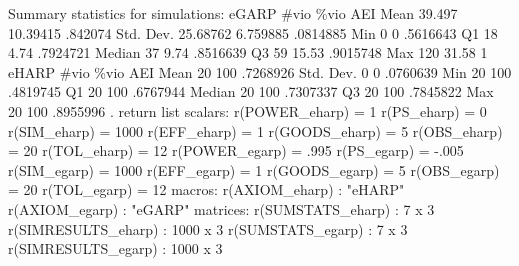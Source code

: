 Summary statistics for simulations:
{\smallskip}
       eGARP {\VBAR}      \#vio       \%vio        AEI 
        Mean {\VBAR}    39.497   10.39415    .842074 
   Std. Dev. {\VBAR}  25.68762   6.759885   .0814885 
         Min {\VBAR}         0          0   .5616643 
          Q1 {\VBAR}        18       4.74   .7924721 
      Median {\VBAR}        37       9.74   .8516639 
          Q3 {\VBAR}        59      15.53   .9015748 
         Max {\VBAR}       120      31.58          1 
{\smallskip}
{\smallskip}
       eHARP {\VBAR}      \#vio       \%vio        AEI 
        Mean {\VBAR}        20        100   .7268926 
   Std. Dev. {\VBAR}         0          0   .0760639 
         Min {\VBAR}        20        100   .4819745 
          Q1 {\VBAR}        20        100   .6767944 
      Median {\VBAR}        20        100   .7307337 
          Q3 {\VBAR}        20        100   .7845822 
         Max {\VBAR}        20        100   .8955996 
{\smallskip}
{\smallskip}
. return list
{\smallskip}
scalars:
        r(POWER_eharp) =  1
           r(PS_eharp) =  0
          r(SIM_eharp) =  1000
          r(EFF_eharp) =  1
        r(GOODS_eharp) =  5
          r(OBS_eharp) =  20
          r(TOL_eharp) =  12
        r(POWER_egarp) =  .995
           r(PS_egarp) =  -.005
          r(SIM_egarp) =  1000
          r(EFF_egarp) =  1
        r(GOODS_egarp) =  5
          r(OBS_egarp) =  20
          r(TOL_egarp) =  12
{\smallskip}
macros:
        r(AXIOM_eharp) : "eHARP"
        r(AXIOM_egarp) : "eGARP"
{\smallskip}
matrices:
     r(SUMSTATS_eharp) :  7 x 3
   r(SIMRESULTS_eharp) :  1000 x 3
     r(SUMSTATS_egarp) :  7 x 3
   r(SIMRESULTS_egarp) :  1000 x 3
{\smallskip}